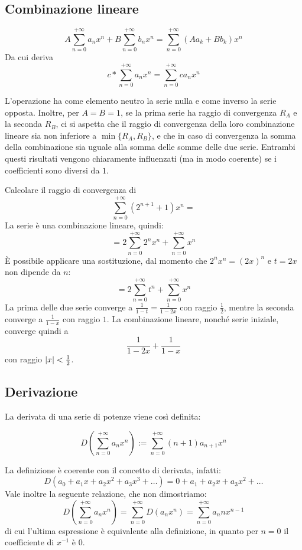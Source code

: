 \subsection{Combinazione lineare}
\begin{defin}
	\label{ser:comblin}
	\begin{equation}
		A\sum_{n=0}^{+\infty}a_n x^n+B\sum_{n=0}^{+\infty} b_nx^n=\sum_{n=0}^{+\infty} (Aa_k+Bb_k)x^n
	\end{equation}
	Da cui deriva
	\begin{equation}
		\label{eq:cperserie}
		c*\sum_{n=0}^{+\infty} a_nx^n=\sum_{n=0}^{+\infty}ca_nx^n
	\end{equation}
\end{defin}
L'operazione ha come elemento neutro la serie nulla e come inverso la serie opposta. Inoltre, per $A=B=1$, se la prima serie ha raggio di convergenza $R_A$ e la seconda $R_B$, ci si aspetta che il raggio di convergenza della loro combinazione lineare sia non inferiore a $\min\{R_A,R_B\}$, e che in caso di convergenza la somma della combinazione sia uguale alla somma delle somme delle due serie. Entrambi questi risultati vengono chiaramente influenzati (ma in modo coerente) se i coefficienti sono diversi da $1$.

\begin{examp}
	Calcolare il raggio di convergenza di
	\[
		\sum_{n=0}^{+\infty}(2^{n+1}+1)x^n=
	\]
	La serie è una combinazione lineare, quindi:
	\[
		=2\sum_{n=0}^{+\infty}2^nx^n+\sum_{n=0}^{+\infty}x^n
	\]
	È possibile applicare una sostituzione, dal momento che $2^nx^n=(2x)^n$ e $t=2x$ non dipende da $n$:
	\[
		=2\sum_{n=0}^{+\infty}t^n+\sum_{n=0}^{+\infty}x^n
	\]
	La prima delle due serie converge a $\frac{1}{1-t}=\frac{1}{1-2x}$ con raggio $\frac{1}{2}$, mentre la seconda converge a $\frac{1}{1-x}$ con raggio $1$. La combinazione lineare, nonché serie iniziale, converge quindi a
	\[
		\frac{1}{1-2x}+\frac{1}{1-x}
	\]
	con raggio $\left\lvert x \right\rvert<\frac{1}{2}$.
\end{examp}


\subsection{Derivazione}
La derivata di una serie di potenze viene così definita:
\begin{defin}
	\[
		D\left(\sum_{n=0}^{+\infty} a_nx^n\right):=\sum_{n=0}^{+\infty}(n+1)a_{n+1}x^n
	\]
\end{defin}
La definizione è coerente con il concetto di derivata, infatti:
\[
	D(a_0+a_1x+a_2x^2+a_3x^3+\dots)=0+a_1+a_2x+a_3x^2+\dots
\]
Vale inoltre la seguente relazione, che non dimostriamo:
\[
	D\left(\sum_{n=0}^{+\infty} a_nx^n\right)=\sum_{n=0}^{+\infty}D(a_nx^n)=\sum_{n=0}^{+\infty}a_nnx^{n-1}
\]
di cui l'ultima espressione è equivalente alla definizione, in quanto per $n=0$ il coefficiente di $x^{-1}$ è $0$.

